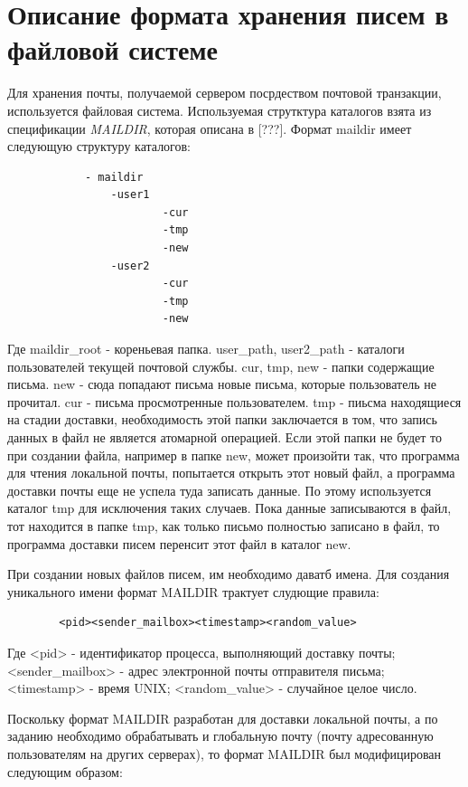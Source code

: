 \documentclass[a4paper,12pt]{report}
\begin{document}
    	\section{Описание формата хранения писем в файловой системе}
    	
	Для хранения почты, получаемой сервером посрдеством почтовой транзакции, используется файловая система. Используемая струтктура каталогов взята из спецификации \textit{MAILDIR}, которая описана в [???]. Формат maildir имеет следующую структуру каталогов:
    	\begin{verbatim}
        	- maildir
        		-user1
            			-cur
            			-tmp
            			-new
        		-user2
            			-cur
            			-tmp
            			-new
    	\end{verbatim}
    Где maildir\_root - кореньевая папка. user\_path, user2\_path - каталоги пользователей текущей почтовой службы. cur, tmp, new - папки содержащие письма. 
    new - сюда попадают письма новые письма, которые пользователь не прочитал. cur - письма просмотренные пользователем. tmp - пиьсма находящиеся на стадии доставки, необходимость этой папки заключается в том, что запись данных в файл не является атомарной операцией. Если этой папки не будет то при создании файла, например в папке new, может произойти так, что программа для чтения локальной почты, попытается открыть этот новый файл, а программа доставки почты еще не успела туда записать данные. По этому используется каталог tmp для исключения таких случаев. Пока данные записываются в файл, тот находится в папке tmp, как только письмо полностью записано в файл, то программа доставки писем перенсит этот файл в каталог new.
    
    При создании новых файлов писем, им необходимо даватб имена. Для создания уникального имени формат MAILDIR трактует слудющие правила:
    \begin{verbatim}
        <pid><sender_mailbox><timestamp><random_value>
    \end{verbatim}
    Где <pid> - идентификатор процесса, выполняющий доставку почты; <sender\_mailbox> - адрес электронной почты отправителя письма;  <timestamp> - время UNIX; <random\_value> - случайное целое число.
    
    Поскольку формат MAILDIR разработан для доставки локальной почты, а по заданию необходимо обрабатывать и глобальную почту (почту адресованную пользователям на других серверах), то формат MAILDIR был модифицирован следующим образом: 
        
\end{document}
